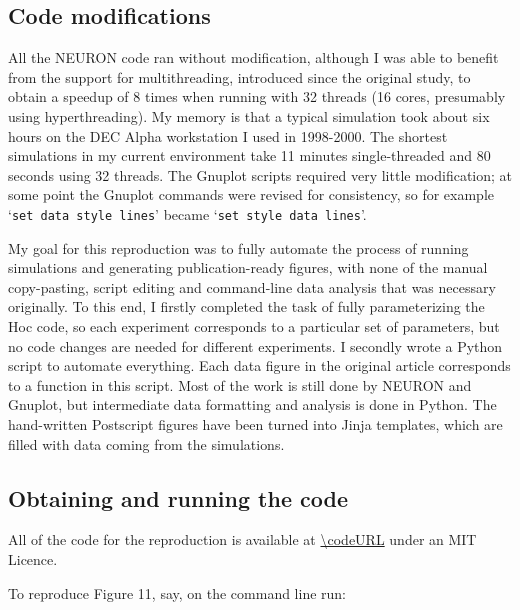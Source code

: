 
\subsection{Code modifications}

All the NEURON code ran without modification, although I was able to benefit from the support for multithreading, introduced since the original study,
 to obtain a speedup of 8 times when running with 32 threads (16 cores, presumably using hyperthreading).
My memory is that a typical simulation took about six hours on the DEC Alpha workstation I used in 1998-2000.
The shortest simulations in my current environment take 11 minutes single-threaded and 80 seconds using 32 threads.
The Gnuplot scripts required very little modification; at some point the Gnuplot commands were revised for consistency, so for example `\lstinline|set data style lines|' became `\lstinline|set style data lines|'.

\vspace{2mm}

My goal for this reproduction was to fully automate the process of running simulations and generating publication-ready figures,
with none of the manual copy-pasting, script editing and command-line data analysis that was necessary originally.
To this end, I firstly completed the task of fully parameterizing the Hoc code, so each experiment corresponds to a particular set of parameters, but no code changes are needed for different experiments.
I secondly wrote a Python script to automate everything. Each data figure in the original article corresponds to a function in this script.
Most of the work is still done by NEURON and Gnuplot, but intermediate data formatting and analysis is done in Python.
The hand-written Postscript figures have been turned into Jinja templates, which are filled with data coming from the simulations.

\subsection{Obtaining and running the code}

\begin{sloppypar}
All of the code for the reproduction is available at \url{\codeURL} under an MIT Licence.
\end{sloppypar}

To reproduce Figure 11, say, on the command line run:

